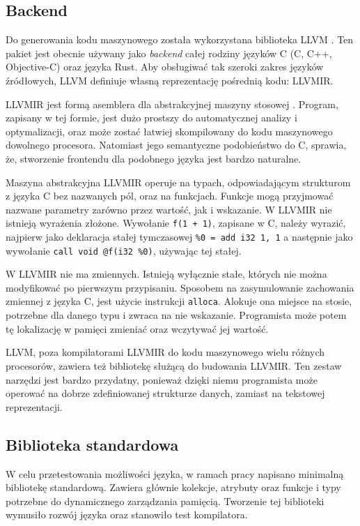 \subsection{Backend}
\label{implementation:backend}
Do generowania kodu maszynowego została wykorzystana biblioteka LLVM \cite{Lattner:MSThesis02}.
Ten pakiet jest obecnie używany jako \emph{backend} całej rodziny języków C (C, C++, Objective-C) oraz języka Rust.
Aby obsługiwać tak szeroki zakres języków źródłowych, LLVM definiuje własną reprezentację pośrednią kodu: LLVMIR.

LLVMIR jest formą asemblera dla abstrakcyjnej maszyny stosowej \cite{llvmir}.
Program, zapisany w tej formie, jest dużo prostszy do automatycznej analizy i optymalizacji, oraz może zostać łatwiej skompilowany do kodu maszynowego dowolnego procesora.
Natomiast jego semantyczne podobieństwo do C, sprawia, że, stworzenie frontendu dla podobnego języka jest bardzo naturalne.

Maszyna abstrakcyjna LLVMIR operuje na typach, odpowiadającym strukturom z języka C bez nazwanych pól, oraz na funkcjach.
Funkcje mogą przyjmować nazwane parametry zarówno przez wartość, jak i wskazanie.
W LLVMIR nie istnieją wyrażenia złożone.
Wywołanie \lstinline{f(1 + 1)}, zapisane w C, należy wyrazić, najpierw jako deklaracja stałej tymczasowej \lstinline{%0 = add i32 1, 1} a następnie jako wywołanie \lstinline{call void @f(i32 %0)}, używając tej stałej.

W LLVMIR nie ma zmiennych.
Istnieją wyłącznie stałe, których nie można modyfikować po pierwszym przypisaniu.
Sposobem na zasymulowanie zachowania zmiennej z języka C, jest użycie instrukcji \lstinline{alloca}.
Alokuje ona miejsce na stosie, potrzebne dla danego typu i zwraca na nie wskazanie.
Programista może potem tę lokalizację w pamięci zmieniać oraz wczytywać jej wartość.

LLVM, poza kompilatorami LLVMIR do kodu maszynowego wielu różnych procesorów, zawiera też bibliotekę służącą do budowania LLVMIR.
Ten zestaw narzędzi jest bardzo przydatny, ponieważ dzięki niemu programista może operować na dobrze zdefiniowanej strukturze danych, zamiast na tekstowej reprezentacji.

\subsection{Biblioteka standardowa}

W celu przetestowania możliwości języka, w ramach pracy napisano minimalną bibliotekę standardową.
Zawiera głównie kolekcje, atrybuty oraz funkcje i typy potrzebne do dynamicznego zarządzania pamięcią.
Tworzenie tej biblioteki wymusiło rozwój języka oraz stanowiło test kompilatora.

